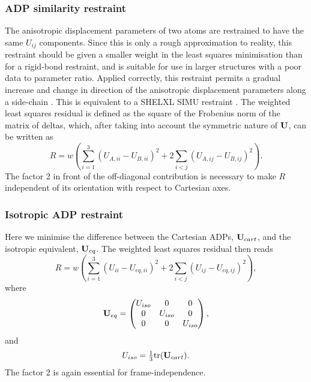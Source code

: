 \documentclass[12pt]{article}
\begin{document}
\subsubsection{ADP similarity restraint}
\label{ADP:similarity}
The anisotropic displacement parameters of two atoms are restrained to have the same $U_{ij}$ components. Since this is only a rough approximation to reality, this restraint should be given a smaller weight in the least squares minimisation than for a rigid-bond restraint, and is suitable for use in larger structures with a poor data to parameter ratio. Applied correctly, this restraint permits a gradual increase and change in direction of the anisotropic displacement parameters along a side-chain \cite{SHELX:man97}. This is equivalent to a SHELXL SIMU restraint \cite{SHELX:man97}.
The weighted least squares residual is defined as the square of the Frobenius norm of the matrix of deltas, which, after taking into account the symmetric nature of $\mathbf{U}$, can be written as
\begin{equation}
R = w \left( \sum_{i=1}^3 (U_{A,ii} - U_{B,ii})^2 + 2 \sum_{i < j} (U_{A,ij} - U_{B,ij})^2 \right) .
\end{equation}
The factor 2 in front of the off-diagonal contribution is necessary to make $R$ independent of its orientation with respect to Cartesian axes.



\subsubsection{Isotropic ADP restraint}
Here we minimise the difference between the Cartesian ADPs, $\mathbf{U}_{cart}$, and the isotropic equivalent, $\mathbf{U}_{eq}$. The weighted least squares residual then reads
\begin{equation}
R = w \left( \sum_{i=1}^3 (U_{ii} - U_{eq,ii})^2 + 2 \sum_{i<j} (U_{ij} - U_{eq,ij})^2 \right) ,
\end{equation}
where
\begin{equation}
\mathbf{U}_{eq} = 
\begin{pmatrix} U_{iso} & 0 & 0\\
  0 & U_{iso} & 0\\
  0 & 0 & U_{iso}\end{pmatrix},
\end{equation}
and
\begin{equation}
U_{iso} = \tfrac{1}{3} \mathrm{tr}(\mathbf{U}_{cart}).
\end{equation}
The factor 2 is again essential for frame-independence.
\end{document}
